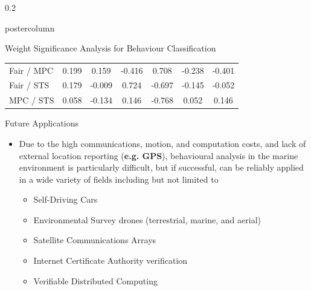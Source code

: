 \documentclass[final,hyperref={pdfpagelabels=false}]{beamer}
\def\colwidth{0.2\linewidth}
\begin{document}
\begin{frame}[fragile]
\begin{columns}[T]
\begin{column}{\colwidth}
\begin{beamercolorbox}[center,wd=\textwidth]{postercolumn}
\begin{minipage}[T]{.98\textwidth}
{\begin{block}{Weight Significance Analysis for Behaviour Classification}
\begin{table}[h]
\begin{center}
\begin{tabular}{lcccccc}
										Fair / MPC       & 0.199 &  0.159   & -0.416  &  0.708   & -0.238   & -0.401\\
										Fair / STS       & 0.179 &  -0.009  &  0.724  & -0.697   & -0.145   & -0.052\\
										MPC / STS        & 0.058 &  -0.134  &  0.146  & -0.768   &  0.052   &  0.146\\
										\bottomrule
									\end{tabular}
								\end{center}
							\end{table}
						\end{block}
						
						\begin{block}{Future Applications}
							\begin{itemize}
								\item Due to the high communications, motion, and computation costs, and lack of external location reporting (\textbf{e.g. GPS}), 
								behavioural analysis in the marine environment is particularly difficult, but if successful, can be reliably applied in a wide 
								variety of fields including but not limited to
								\begin{itemize}
									\item Self-Driving Cars
									\item Environmental Survey drones (terrestrial, marine, and aerial)
									\item Satellite Communications Arrays
									\item Internet Certificate Authority verification
									\item Verifiable Distributed Computing
								\end{itemize}
							\end{itemize}              
						\end{block}
												
}
\end{minipage}
\end{beamercolorbox}
\end{column}
\end{columns}
\end{frame}
\end{document}
